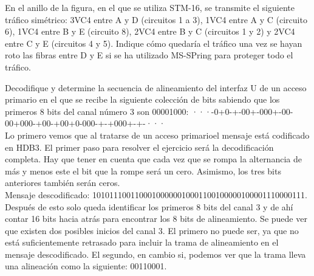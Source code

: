\begin{exercise}[5]
	En el anillo de la figura, en el que se utiliza STM-16, se transmite el siguiente tráfico simétrico: 3VC4 entre A y D (circuitos 1 a 3), 1VC4 entre A y C (circuito 6), 1VC4 entre B y E (circuito 8), 2VC4 entre B y C (circuitos 1 y 2) y 2VC4 entre C y E (circuitos 4 y 5). Indique cómo quedaría el tráfico una vez se hayan roto las fibras entre D y E si se ha utilizado MS-SPring para proteger todo el tráfico.
\end{exercise}
\begin{exercise}[6]
	Decodifique y determine la secuencia de alineamiento del interfaz U de un acceso primario en el que se recibe la siguiente colección de bits sabiendo que los primeros 8 bits del canal número 3 son 00001000: ···-0+0-+-00+-000+-00-00+000-+00-+00+0-000-+-+000+-+-···\\
	Lo primero vemos que al tratarse de un acceso primarioel mensaje está codificado en HDB3. El primer paso para resolver el ejercicio será la decodificación completa. Hay que tener en cuenta que cada vez que se rompa la alternancia de más y menos este el bit que la rompe será un cero. Asimismo, los tres bits anteriores también serán ceros.\\
	Mensaje descodificado: 10101110011000100000010001100100000100001110000111. Después de esto solo queda identificar los primeros 8 bits del canal 3 y de ahí contar 16 bits hacia atrás para encontrar los 8 bits de alineamiento. Se puede ver que existen dos posibles inicios del canal 3. El primero no puede ser, ya que no está suficientemente retrasado para incluir la trama de alineamiento en el mensaje descodificado. El segundo, en cambio si, podemos ver que la trama lleva una alineación como la siguiente: 00110001.
\end{exercise}

